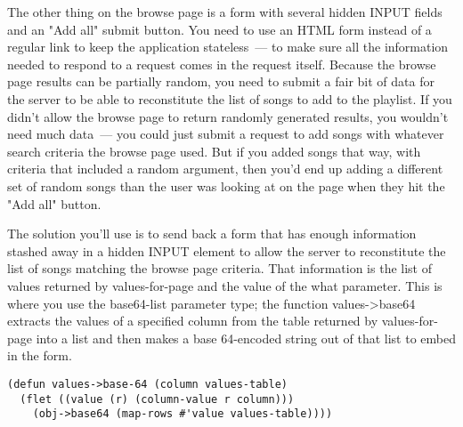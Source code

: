 The other thing on the browse page is a form with several hidden INPUT fields and an "Add
all" submit button. You need to use an HTML form instead of a regular link to keep the
application stateless~--- to make sure all the information needed to respond to a request
comes in the request itself. Because the browse page results can be partially random, you
need to submit a fair bit of data for the server to be able to reconstitute the list of
songs to add to the playlist. If you didn't allow the browse page to return randomly
generated results, you wouldn't need much data~--- you could just submit a request to add
songs with whatever search criteria the browse page used. But if you added songs that way,
with criteria that included a random argument, then you'd end up adding a different set of
random songs than the user was looking at on the page when they hit the "Add all" button.

The solution you'll use is to send back a form that has enough information stashed away in
a hidden INPUT element to allow the server to reconstitute the list of songs matching the
browse page criteria. That information is the list of values returned by values-for-page
and the value of the what parameter. This is where you use the base64-list parameter type;
the function values->base64 extracts the values of a specified column from the table
returned by values-for-page into a list and then makes a base 64-encoded string out of
that list to embed in the form.

\begin{lstlisting}
(defun values->base-64 (column values-table)
  (flet ((value (r) (column-value r column)))
    (obj->base64 (map-rows #'value values-table))))
\end{lstlisting}

